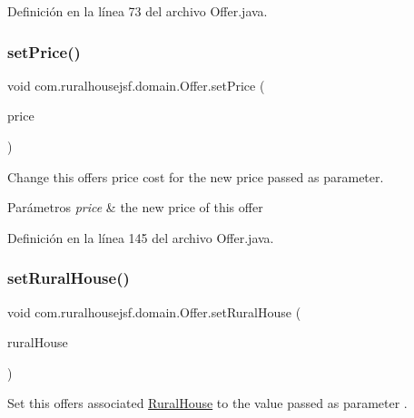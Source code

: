 Definición en la línea 73 del archivo Offer.\+java.

\mbox{\label{classcom_1_1ruralhousejsf_1_1domain_1_1_offer_aaf77b7df1299a14ecc9cae2040dec6af}} 
\subsubsection{\texorpdfstring{setPrice()}{setPrice()}}
{\footnotesize\ttfamily void com.\+ruralhousejsf.\+domain.\+Offer.\+set\+Price (\begin{DoxyParamCaption}\item[{double}]{price }\end{DoxyParamCaption})}

Change this offers price cost for the new price passed as parameter.


\begin{DoxyParams}{Parámetros}
{\em price} & the new price of this offer \\
\hline
\end{DoxyParams}


Definición en la línea 145 del archivo Offer.\+java.

\mbox{\label{classcom_1_1ruralhousejsf_1_1domain_1_1_offer_ab10c2d200d23aff2383f720b1dcecd02}} 
\subsubsection{\texorpdfstring{setRuralHouse()}{setRuralHouse()}}
{\footnotesize\ttfamily void com.\+ruralhousejsf.\+domain.\+Offer.\+set\+Rural\+House (\begin{DoxyParamCaption}\item[{\mbox{\hyperlink{classcom_1_1ruralhousejsf_1_1domain_1_1_rural_house}{Rural\+House}}}]{rural\+House }\end{DoxyParamCaption})}

Set this offers associated \mbox{\hyperlink{classcom_1_1ruralhousejsf_1_1domain_1_1_rural_house}{Rural\+House}} to the value passed as parameter .


